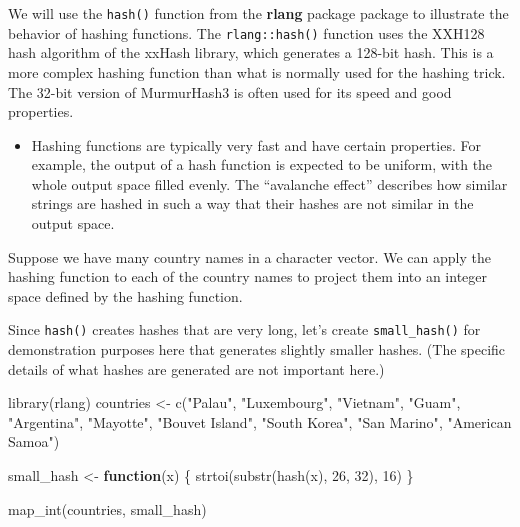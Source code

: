 \documentclass[
]{krantz}
\makeatletter
\newenvironment{Shaded}{\begin{snugshade}}{\end{snugshade}}
\newcommand{\ControlFlowTok}[1]{\textcolor[rgb]{0.13,0.29,0.53}{\textbf{#1}}}
\newcommand{\DecValTok}[1]{\textcolor[rgb]{0.00,0.00,0.81}{#1}}
\newcommand{\FunctionTok}[1]{\textcolor[rgb]{0.00,0.00,0.00}{#1}}
\newcommand{\NormalTok}[1]{#1}
\newcommand{\OtherTok}[1]{\textcolor[rgb]{0.56,0.35,0.01}{#1}}
\newcommand{\StringTok}[1]{\textcolor[rgb]{0.31,0.60,0.02}{#1}}
\newenvironment{kframe}{%
\medskip{}
\setlength{\fboxsep}{.8em}
 \def\at@end@of@kframe{}%
 \ifinner\ifhmode%
  \def\at@end@of@kframe{\end{minipage}}%
  \begin{minipage}{\columnwidth}%
 \fi\fi%
 \def\FrameCommand##1{\hskip\@totalleftmargin \hskip-\fboxsep
 \colorbox{shadecolor}{##1}\hskip-\fboxsep
     \hskip-\linewidth \hskip-\@totalleftmargin \hskip\columnwidth}%
 \MakeFramed {\advance\hsize-\width
   \@totalleftmargin\z@ \linewidth\hsize
   \@setminipage}}%
 {\par\unskip\endMakeFramed%
 \at@end@of@kframe}
\renewenvironment{Shaded}{\begin{kframe}}{\end{kframe}}
\newenvironment{rmdblock}[1]
  {\begin{shaded*}
  \begin{itemize}[left = -1cm, labelsep = 1cm]
  \renewcommand{\labelitemi}{
    \raisebox{-.7\height}[0pt][0pt]{
      {\setkeys{Gin}{width=3em,keepaspectratio}\texttt{[image: images/\#1]}}
    }
  }
 
  \item
  }
  {
  \end{itemize}
  \end{shaded*}
  }
\newenvironment{rmdnote}
  {\begin{rmdblock}{note}}
  {\end{rmdblock}}
\makeatother
\begin{document}
We will use the \texttt{hash()} function from the \textbf{rlang} package package to illustrate the behavior of hashing functions.
The \texttt{rlang::hash()} function uses the XXH128 hash algorithm of the xxHash library, which generates a 128-bit hash. This is a more complex hashing function than what is normally used for the hashing trick. The 32-bit version of MurmurHash3 \citep{appleby2008} is often used for its speed and good properties.

\begin{rmdnote}
Hashing functions are typically very fast and have certain properties.
For example, the output of a hash function is expected to be uniform,
with the whole output space filled evenly. The ``avalanche effect''
describes how similar strings are hashed in such a way that their hashes
are not similar in the output space.
\end{rmdnote}

Suppose we have many country names in a character vector.
We can apply the hashing function to each of the country names to project them into an integer space defined by the hashing function.

Since \texttt{hash()} creates hashes that are very long, let's create \texttt{small\_hash()} for demonstration purposes here that generates slightly smaller hashes. (The specific details of what hashes are generated are not important here.)

\begin{Shaded}
\begin{Highlighting}[]
\FunctionTok{library}\NormalTok{(rlang)}
\NormalTok{countries }\OtherTok{\textless{}{-}} \FunctionTok{c}\NormalTok{(}\StringTok{"Palau"}\NormalTok{, }\StringTok{"Luxembourg"}\NormalTok{, }\StringTok{"Vietnam"}\NormalTok{, }\StringTok{"Guam"}\NormalTok{, }\StringTok{"Argentina"}\NormalTok{,}
               \StringTok{"Mayotte"}\NormalTok{, }\StringTok{"Bouvet Island"}\NormalTok{, }\StringTok{"South Korea"}\NormalTok{, }\StringTok{"San Marino"}\NormalTok{,}
               \StringTok{"American Samoa"}\NormalTok{)}

\NormalTok{small\_hash }\OtherTok{\textless{}{-}} \ControlFlowTok{function}\NormalTok{(x) \{}
  \FunctionTok{strtoi}\NormalTok{(}\FunctionTok{substr}\NormalTok{(}\FunctionTok{hash}\NormalTok{(x), }\DecValTok{26}\NormalTok{, }\DecValTok{32}\NormalTok{), }\DecValTok{16}\NormalTok{)}
\NormalTok{\}}

\FunctionTok{map\_int}\NormalTok{(countries, small\_hash)}
\end{Highlighting}
\end{Shaded}
\end{document}

